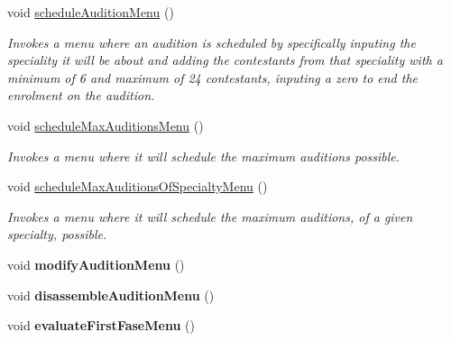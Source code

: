 \begin{DoxyCompactItemize}
\mbox{\label{class_company_m_s_a76272b167a7998779d794f6364812947}} 
void \hyperlink{class_company_m_s_a76272b167a7998779d794f6364812947}{schedule\+Audition\+Menu} ()
\begin{DoxyCompactList}\small\item\em Invokes a menu where an audition is scheduled by specifically inputing the speciality it will be about and adding the contestants from that speciality with a minimum of 6 and maximum of 24 contestants, inputing a zero to end the enrolment on the audition. \end{DoxyCompactList}\item 
\mbox{\label{class_company_m_s_a901868af75ab363760fdda9b2da76650}} 
void \hyperlink{class_company_m_s_a901868af75ab363760fdda9b2da76650}{schedule\+Max\+Auditions\+Menu} ()
\begin{DoxyCompactList}\small\item\em Invokes a menu where it will schedule the maximum auditions possible. \end{DoxyCompactList}\item 
\mbox{\label{class_company_m_s_ae4f6987bf9f61cfd9eba52a162f5efcc}} 
void \hyperlink{class_company_m_s_ae4f6987bf9f61cfd9eba52a162f5efcc}{schedule\+Max\+Auditions\+Of\+Specialty\+Menu} ()
\begin{DoxyCompactList}\small\item\em Invokes a menu where it will schedule the maximum auditions, of a given specialty, possible. \end{DoxyCompactList}\item 
\mbox{\label{class_company_m_s_aa30dc2cc12eb6f553b92c69e803083e3}} 
void {\bfseries modify\+Audition\+Menu} ()
\item 
\mbox{\label{class_company_m_s_aab9a0535cb3c6e0f909f892db15d3b92}} 
void {\bfseries disassemble\+Audition\+Menu} ()
\item 
\mbox{\label{class_company_m_s_a3143d2abcdcc2fcb40de37732a12aa2f}} 
void {\bfseries evaluate\+First\+Fase\+Menu} ()
\item 
\mbox{\label{class_company_m_s_a5652dc1d6ec24572f75a783e87da5661}} 

\end{DoxyCompactItemize}
